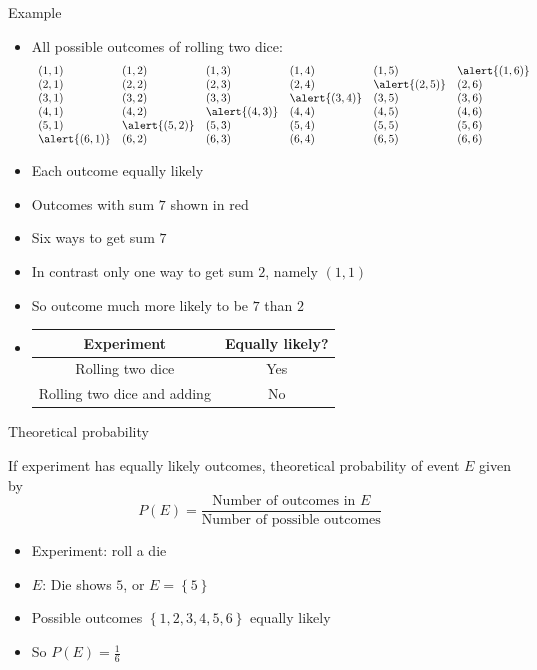 \documentclass[handout]{beamer}
\theoremstyle{definition}
\begin{document}
\begin{frame}{Example}
\begin{itemize}
\item All possible outcomes of rolling two dice:
\[\begin{array}{llllll}
\left(1,1\right)&
\left(1,2\right)&
\left(1,3\right)&
\left(1,4\right)&
\left(1,5\right)&
\alert{\left(1,6\right)}\\
\left(2,1\right)&
\left(2,2\right)&
\left(2,3\right)&
\left(2,4\right)&
\alert{\left(2,5\right)}&
\left(2,6\right)\\
\left(3,1\right)&
\left(3,2\right)&
\left(3,3\right)&
\alert{\left(3,4\right)}&
\left(3,5\right)&
\left(3,6\right)\\
\left(4,1\right)&
\left(4,2\right)&
\alert{\left(4,3\right)}&
\left(4,4\right)&
\left(4,5\right)&
\left(4,6\right)\\
\left(5,1\right)&
\alert{\left(5,2\right)}&
\left(5,3\right)&
\left(5,4\right)&
\left(5,5\right)&
\left(5,6\right)\\
\alert{\left(6,1\right)}&
\left(6,2\right)&
\left(6,3\right)&
\left(6,4\right)&
\left(6,5\right)&
\left(6,6\right)
\end{array}\]
\item Each outcome equally likely
\item Outcomes with sum $7$ shown in \alert{red}
\item Six ways to get sum $7$
\item In contrast only \alert{one} way to get sum $2$, namely $\left(1,1\right)$
\item So outcome much more likely to be $7$ than $2$
\item[]
\begin{tabular}{c|c}
{\bf Experiment}&{\bf Equally likely?}\\\hline
Rolling two dice&Yes\\\hline
Rolling two dice and adding&No
\end{tabular}
\end{itemize}
\end{frame}

\begin{frame}{Theoretical probability}
\begin{definition} If experiment has equally
likely outcomes, \alert{theoretical probability}
of event $E$ given by
\[P\left(E\right)
=\frac{\text{Number of outcomes in $E$}}{\text{Number of possible outcomes}}\]
\end{definition}
\begin{example}
\begin{itemize}
\item Experiment: roll a die
\item $E$: Die shows $5$, or $E=\left\{5\right\}$
\item Possible outcomes $\left\{1,2,3,4,5,6\right\}$ equally likely
\item So $P\left(E\right)=\frac{1}{6}$
\end{itemize}
\end{example}
\end{frame}
\end{document}
